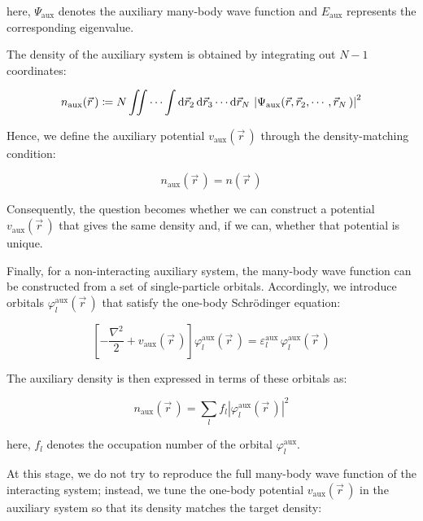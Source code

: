 here, $\Psi_\mathrm{aux}$ denotes the auxiliary many-body wave function and $E_\mathrm{aux}$ represents the corresponding eigenvalue.

The density of the auxiliary system is obtained by integrating out $N-1$ coordinates:

\begin{equation}
    n_\mathrm{aux}(\vec{r}\,)\coloneqq
    N\iint\cdots\int\mathrm{d}{\vec{r}_2}\,\mathrm{d}{\vec{r}_3}\cdots\mathrm{d}{\vec{r}_N}\,
    \left|\Psi_\mathrm{aux}(\vec{r},\vec{r}_2,\cdots,\vec{r}_N\,)\right|^2
\label{density_aux}
\end{equation}

Hence, we define the auxiliary potential $v_\mathrm{aux}(\vec{r}\,)$ through the density-matching condition:

\begin{equation}
n_\mathrm{aux}(\vec{r}\,) = n(\vec{r}\,)
\label{auxiliary_density_matching_condition}
\end{equation}

Consequently, the question becomes whether we can construct a potential $v_\mathrm{aux}(\vec{r}\,)$ that gives the same density and, if we can, whether that potential is unique.

Finally, for a non-interacting auxiliary system, the many-body wave function can be constructed from a set of single-particle orbitals.
Accordingly, we introduce orbitals $\varphi^\mathrm{aux}_l(\vec{r}\,)$ that satisfy the one-body Schrödinger equation:

\begin{equation}
    \left[-\frac{\nabla^2}{2}+v_\mathrm{aux}(\vec{r}\,)\right]
    \varphi^\mathrm{aux}_l(\vec{r}\,)
    = \varepsilon^\mathrm{aux}_l\,\varphi^\mathrm{aux}_l(\vec{r}\,)
\label{aux_single_particle_equation}
\end{equation}

The auxiliary density is then expressed in terms of these orbitals as:

\begin{equation}
    n_\mathrm{aux}(\vec{r}\,) = \sum_l f_l\left|\varphi^\mathrm{aux}_l(\vec{r}\,)\right|^2
\label{aux_density_orbitals}
\end{equation}

here, $f_l$ denotes the occupation number of the orbital $\varphi^\mathrm{aux}_l$.

At this stage, we do not try to reproduce the full many-body wave function of the interacting system;
instead, we tune the one-body potential $v_\mathrm{aux}(\vec{r}\,)$ in the auxiliary system so that its density matches the target density:

